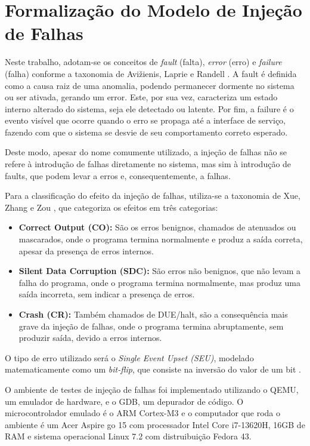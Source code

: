 \documentclass[12pt,a4paper]{article}
\begin{document}
\section{Formalização do Modelo de Injeção de Falhas}

Neste trabalho, adotam-se os conceitos de \textit{fault} (falta), \textit{error} (erro) e \textit{failure} (falha) conforme a taxonomia de Avižienis, Laprie e Randell \cite{Avizienis2001}. A fault é definida como a causa raiz de uma anomalia, podendo permanecer dormente no sistema ou ser ativada, gerando um error. Este, por sua vez, caracteriza um estado interno alterado do sistema, seja ele detectado ou latente. Por fim, a failure é o evento visível que ocorre quando o erro se propaga até a interface de serviço, fazendo com que o sistema se desvie de seu comportamento correto esperado.

Deste modo, apesar do nome comumente utilizado, a injeção de falhas não se refere à introdução de falhas diretamente no sistema, mas sim à introdução de faults, que podem levar a erros e, consequentemente, a falhas. 

Para a classificação do efeito da injeção de falhas, utiliza-se a taxonomia de Xue, Zhang e Zou \cite{Xue2019}, que categoriza os efeitos em três categorias: 
\begin{itemize}
    \item \textbf{Correct Output (CO):} São os erros benignos, chamados de atenuados ou mascarados, onde o programa termina normalmente e produz a saída correta, apesar da presença de erros internos.
    \item \textbf{Silent Data Corruption (SDC):} São erros não benignos, que não levam a falha do programa, onde o programa termina normalmente, mas produz uma saída incorreta, sem indicar a presença de erros.
    \item \textbf{Crash (CR):} Também chamados de DUE/halt, são a consequência mais grave da injeção de falhas, onde o programa termina abruptamente, sem produzir saída, devido a erros internos.
\end{itemize}

O tipo de erro utilizado será o \textit{Single Event Upset (SEU)}, modelado matematicamente como um \textit{bit-flip}, que consiste na inversão do valor de um bit \cite{Geissler2014}.

O ambiente de testes de injeção de falhas foi implementado utilizando o QEMU, um emulador de hardware, e o GDB, um depurador de código. O microcontrolador emulado é o ARM Cortex-M3 e o computador que roda o ambiente é um Acer Aspire go 15 com processador Intel Core i7-13620H, 16GB de RAM e sistema operacional Linux 7.2 com distruibuição Fedora 43.
\end{document}
